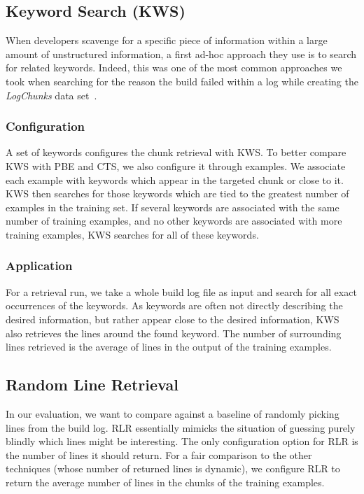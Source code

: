\subsection{Keyword Search (KWS)}
\label{sec:expl-skws}
When developers scavenge for a specific piece of information within a
large amount of unstructured information, a first ad-hoc approach they
use is to search for related keywords. Indeed, this was one of the
most common approaches we took when searching for the reason the build
failed within a log while creating the \emph{LogChunks} data
set~\cite{brandt2020logchunks}.

\subsubsection{Configuration}
A set of keywords configures the chunk retrieval with KWS\@. To better
compare KWS with PBE and CTS, we also configure it through examples.
We associate each example with keywords which appear in the targeted
chunk or close to it. 
KWS then searches for those keywords which are tied to the greatest
number of examples in the training set.
If several keywords are associated with the same number of training
examples, and no other keywords are associated with more training
examples, KWS searches for all of these keywords.

\subsubsection{Application}
For a retrieval run, we take a whole build log file as input and
search for all exact occurrences of the keywords. As keywords are
often not directly describing the desired information, but rather
appear close to the desired information, KWS also retrieves the lines
around the found keyword. The number of surrounding lines retrieved is
the average of lines in the output of the training examples.


\subsection{Random Line Retrieval}
\label{sec:expl-rlr}
In our evaluation, we want to compare against a baseline of randomly
picking lines from the build log. RLR essentially mimicks the
situation of guessing purely blindly which lines might be interesting.
The only configuration option for RLR is the number of lines it should
return. For a fair comparison to the other techniques (whose number of
returned lines is dynamic), we configure RLR to return the average
number of lines in the chunks of the training examples. 

